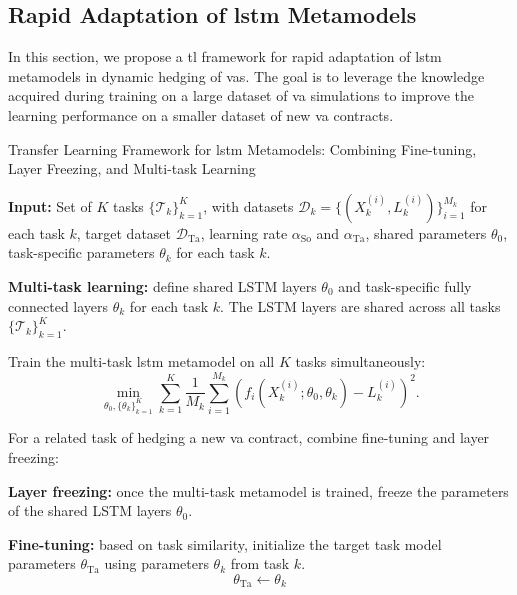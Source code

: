 \subsection{Rapid Adaptation of \gls{lstm} Metamodels} \label{sec3:transfer_learning}

In this section, we propose a \gls{tl} framework for rapid adaptation of \gls{lstm} metamodels in dynamic hedging of \gls{va}s.
The goal is to leverage the knowledge acquired during training on a large dataset of \gls{va} simulations to improve the learning performance on a smaller dataset of new \gls{va} contracts.


\begin{algorithm}
    \caption{Transfer Learning Framework for \gls{lstm} Metamodels: Combining Fine-tuning, Layer Freezing, and Multi-task Learning}
    \begin{algorithmic}[1] \label{alg3:combined}
        \STATE \textbf{Input:} Set of $K$ tasks $\{\mathcal{T}_k\}_{k=1}^K$, with datasets $\mathcal{D}_k = \{(X_k^{(i)}, L_k^{(i)})\}_{i=1}^{M_k}$ for each task $k$, target dataset $\mathcal{D}_{\text{Ta}}$, learning rate $\alpha_{\text{So}}$ and $\alpha_{\text{Ta}}$, shared parameters $\theta_0$, task-specific parameters $\theta_k$ for each task $k$.
        
        \STATE \textbf{Multi-task learning:} define shared LSTM layers $\theta_0$ and task-specific fully connected layers $\theta_k$ for each task $k$. The LSTM layers are shared across all tasks $\{\mathcal{T}_k\}_{k=1}^K$.
        
        \STATE Train the multi-task \gls{lstm} metamodel on all $K$ tasks simultaneously:
        \begin{equation}
            \min_{\theta_0, \{\theta_k\}_{k=1}^K} \sum_{k=1}^K \frac{1}{M_k} \sum_{i=1}^{M_k} \left( f_i(X_k^{(i)}; \theta_0, \theta_k) - L_k^{(i)} \right)^2.
        \end{equation}
        
        \STATE For a related task of hedging a new \gls{va} contract, combine fine-tuning and layer freezing:

        \STATE \textbf{Layer freezing:} once the multi-task metamodel is trained, freeze the parameters of the shared LSTM layers $\theta_0$.
        
        \STATE \textbf{Fine-tuning:}  based on task similarity, initialize the target task model parameters $\theta_{\text{Ta}}$ using parameters $\theta_k$ from task $k$.
        \[
        \theta_{\text{Ta}} \gets \theta_k 
        \]
        

\end{algorithmic}
\end{algorithm}
